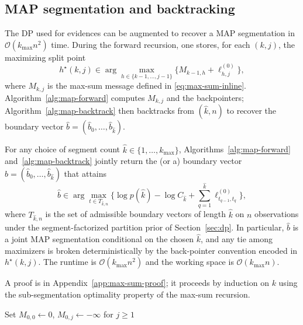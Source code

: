 \subsection{MAP segmentation and backtracking}
\label{sec:alg-map}

The DP used for evidences can be augmented to recover a MAP segmentation in
$\mathcal{O}(k_{\max}n^2)$ time.
During the forward recursion, one stores, for each $(k,j)$, the maximizing split point
\begin{equation}
    h^\star(k,j)\in\arg\max_{h\in\{k-1,\dots,j-1\}} \Big\{M_{k-1,h}+\ell^{(0)}_{h,j}\Big\},
    \label{eq:map-backpointer}
\end{equation}
where $M_{k,j}$ is the max-sum message defined in \eqref{eq:max-sum-inline}.
Algorithm~\ref{alg:map-forward} computes $M_{k,j}$ and the backpointers; Algorithm~\ref{alg:map-backtrack} then backtracks from $(\widehat{k},n)$ to recover the boundary vector
$\widehat{b}=(\widehat{b}_0,\dots,\widehat{b}_{\widehat{k}})$.

\begin{theorem}
\label{thm:map-correctness}
For any choice of segment count $\widehat k\in\{1,\dots,k_{\max}\}$, Algorithms~\ref{alg:map-forward}
and~\ref{alg:map-backtrack} jointly return the (or a) boundary vector
$\widehat b=(\widehat b_0,\dots,\widehat b_{\widehat k})$ that attains
\[
\widehat b \in \arg\max_{t\in T_{\widehat k,n}}\Big\{
   \log p(\widehat k) - \log C_{\widehat k} + \sum_{q=1}^{\widehat k} \ell^{(0)}_{t_{q-1},t_q}
\Big\},
\]
where $T_{\widehat k,n}$ is the set of admissible boundary vectors of length $\widehat k$ on $n$
observations under the segment-factorized partition prior of Section~\ref{sec:dp}. In particular,
$\widehat b$ is a joint MAP segmentation conditional on the chosen $\widehat k$, and any tie among
maximizers is broken deterministically by the back-pointer convention encoded in
$h^\star(k,j)$. The runtime is $\mathcal{O}(k_{\max}n^2)$ and the working space is
$\mathcal{O}(k_{\max}n)$.
\end{theorem}

A proof is in Appendix~\ref{app:max-sum-proof}; it proceeds by induction on $k$ using the
sub-segmentation optimality property of the max-sum recursion.

\begin{algorithm}[H]
\caption{MAPForward$(\ell^{(0)}_{ij},k_{\max})$}
\label{alg:map-forward}
\BlankLine
Set $M_{0,0}\leftarrow 0$, $M_{0,j}\leftarrow -\infty$ for $j\ge 1$\;
\end{algorithm}

